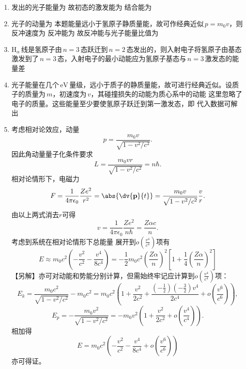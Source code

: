 \begin{enumerate}[label=1.\arabic*]
\item
发出的光子能量为
故初态的激发能为
结合能为

\item
光子的动量为
本题能量远小于氢原子静质量能，故可作经典近似$\,p=m_0v$，则反冲速度为
反冲能为
故反冲能与光子能量比值为

\item
$\mathrm{H}_\alpha\,$线是氢原子由$\,n=3\,$态跃迁到$\,n=2\,$态发出的，则入射电子将氢原子由基态激发到了$\,n=3\,$态，入射电子的最小动能应为氢原子基态与$\,n=3\,$激发态的能量差

\item
光子能量在几个$\,\mathrm{eV}\,$量级，远小于质子的静质量能，故可进行经典近似。设质子的质量为$\,m$，初速度为$\,v$，其碰撞损失的动能为质心系中的动能
这里忽略了电子的质量。这些能量至少要使氢原子跃迁到第一激发态，即
代入数据可解出

\item 
考虑相对论效应，动量
\[p = \frac{m_0v}{\sqrt{1-v^2/c^2}}.\]
因此角动量量子化条件要求
\[L= \frac{m_0vr}{\sqrt{1-v^2/c^2} }= n\hbar.\]
相对论情形下，电磁力
\[F = \frac{1}{4\pi\epsilon_0}\frac{Ze^2}{r^2} = \abs{\dv{\mathbf{p}}{t}} = \frac{m_0v}{\sqrt{1-v^2/c^2}}\frac{v}{r}.\]
由以上两式消去$r$可得
\[v = \frac{1}{4\pi\epsilon_0}\frac{Ze^2}{n\hbar} = \frac{Z\alpha c}{n}.\]
考虑到系统在相对论情形下总能量 
展开到$o(\frac{v^4}{c^4})$项有
\[E \approx m_0c^2\left(-\frac{v^2}{c^2}-\frac{v^4}{8c^4}\right)
= -\frac{1}{2}m_0c^2\left(\frac{Z\alpha}{n}\right)^2\left[1+\frac{1}{4}\left(\frac{Z\alpha}{n}\right)^2\right]\]
【另解】亦可对动能和势能分别计算，但需始终牢记应计算到$o(\frac{v^4}{c^4})$项：
\[E_k = \frac{m_0 c^2}{\sqrt{1-v^2/c^2}}-m_0c^2 
=m_0c^2\left(1+\frac{v^2}{2c^2}+\frac{(-\frac{1}{2})(-\frac{3}{2})v^4}{2c^4}+o(\frac{v^6}{c^6})\right),\]
\[E_p = -\frac{m_0v^2}{\sqrt{1-v^2/c^2}} = -m_0v^2\left(1+\frac{v^2}{2c^2}+o(\frac{v^4}{c^4})\right).\]
相加得
\[E = m_0c^2\left(-\frac{v^2}{c^2}-\frac{v^4}{8c^4}+o(\frac{v^6}{c^6})\right)\]
亦可得证。


\end{enumerate}
